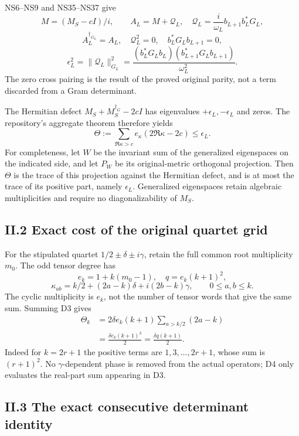 NS6--NS9 and NS35--NS37 give \[
M=(M_S-cI)/i,\qquad A_L=M+\mathcal Q_L,
\quad \mathcal Q_L=\frac{i}{\omega_L}b_{L+1}b_L^*G_L,
\] \[
A_L^{\dagger_{G_L}}=A_L,\quad \mathcal Q_L^2=0,
\quad b_L^*G_Lb_{L+1}=0,
\] \[
\epsilon_L^2=\|\mathcal Q_L\|_{G_L}^2
=\frac{(b_L^*G_Lb_L)(b_{L+1}^*G_Lb_{L+1})}{\omega_L^2}.
\tag{D2}
\] The zero cross pairing is the result of the proved original parity,
not a term discarded from a Gram determinant.

The Hermitian defect \(M_S+M_S^{\dagger_G}-2cI\) has eigenvalues
\(+\epsilon_L,-\epsilon_L\) and zeros. The repository's aggregate
theorem therefore yields \[
\Theta:=\sum_{\Re\kappa>c}e_\kappa(2\Re\kappa-2c)
\le\epsilon_L.
\tag{D3}
\] For completeness, let \(W\) be the invariant sum of the generalized
eigenspaces on the indicated side, and let \(P_W\) be its
original-metric orthogonal projection. Then \(\Theta\) is the trace of
this projection against the Hermitian defect, and is at most the trace
of its positive part, namely \(\epsilon_L\). Generalized eigenspaces
retain algebraic multiplicities and require no diagonalizability of
\(M_S\).

\subsection{II.2 Exact cost of the original quartet
grid}\label{ii.2-exact-cost-of-the-original-quartet-grid}

For the stipulated quartet \(1/2\pm\delta\pm i\gamma\), retain the full
common root multiplicity \(m_0\). The odd tensor degree has \[
e_k=1+k(m_0-1),\quad q=e_k(k+1)^2,
\] \[
\kappa_{ab}=k/2+(2a-k)\delta+i(2b-k)\gamma,
\qquad 0\le a,b\le k.
\] The cyclic multiplicity is \(e_k\), not the number of tensor words
that give the same sum. Summing D3 gives \[
\begin{aligned}
\Theta_k
&=2\delta e_k(k+1)\sum_{a>k/2}(2a-k)\\
&=\boxed{\frac{\delta e_k(k+1)^3}{2}
=\frac{\delta q(k+1)}2}.
\end{aligned}\tag{D4}
\] Indeed for \(k=2r+1\) the positive terms are \(1,3,\ldots,2r+1\),
whose sum is \((r+1)^2\). No \(\gamma\)-dependent phase is removed from
the actual operators; D4 only evaluates the real-part sum appearing in
D3.

\subsection{II.3 The exact consecutive determinant
identity}\label{ii.3-the-exact-consecutive-determinant-identity}

